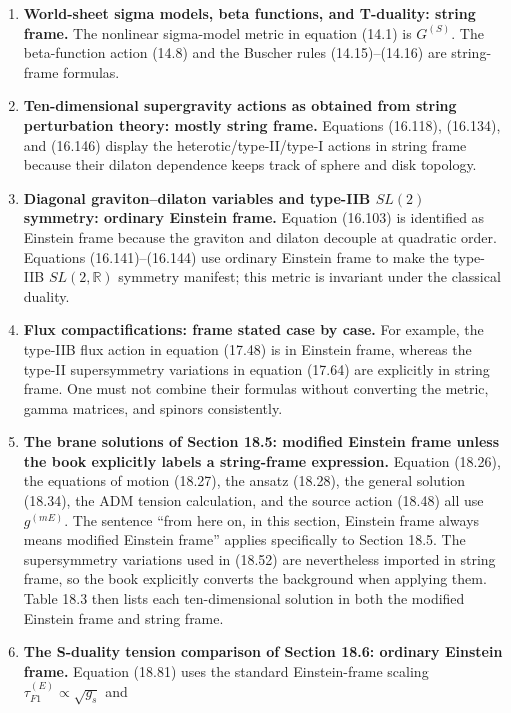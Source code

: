 \documentclass[
  10pt,
  a4paper,
  openany]{book}
\begin{document}
\begin{enumerate}
\def\labelenumi{\arabic{enumi}.}
\item
  \textbf{World-sheet sigma models, beta functions, and T-duality:
  string frame.} The nonlinear sigma-model metric in equation (14.1) is
  \(G^{(S)}\). The beta-function action (14.8) and the Buscher rules
  (14.15)--(14.16) are string-frame formulas.
\item
  \textbf{Ten-dimensional supergravity actions as obtained from string
  perturbation theory: mostly string frame.} Equations (16.118),
  (16.134), and (16.146) display the heterotic/type-II/type-I actions in
  string frame because their dilaton dependence keeps track of sphere
  and disk topology.
\item
  \textbf{Diagonal graviton--dilaton variables and type-IIB \(SL(2)\)
  symmetry: ordinary Einstein frame.} Equation (16.103) is identified as
  Einstein frame because the graviton and dilaton decouple at quadratic
  order. Equations (16.141)--(16.144) use ordinary Einstein frame to
  make the type-IIB \(SL(2,\mathbb R)\) symmetry manifest; this metric
  is invariant under the classical duality.
\item
  \textbf{Flux compactifications: frame stated case by case.} For
  example, the type-IIB flux action in equation (17.48) is in Einstein
  frame, whereas the type-II supersymmetry variations in equation
  (17.64) are explicitly in string frame. One must not combine their
  formulas without converting the metric, gamma matrices, and spinors
  consistently.
\item
  \textbf{The brane solutions of Section 18.5: modified Einstein frame
  unless the book explicitly labels a string-frame expression.} Equation
  (18.26), the equations of motion (18.27), the ansatz (18.28), the
  general solution (18.34), the ADM tension calculation, and the source
  action (18.48) all use \(g^{(mE)}\). The sentence ``from here on, in
  this section, Einstein frame always means modified Einstein frame''
  applies specifically to Section 18.5. The supersymmetry variations
  used in (18.52) are nevertheless imported in string frame, so the book
  explicitly converts the background when applying them. Table 18.3 then
  lists each ten-dimensional solution in both the modified Einstein
  frame and string frame.
\item
  \textbf{The S-duality tension comparison of Section 18.6: ordinary
  Einstein frame.} Equation (18.81) uses the standard Einstein-frame
  scaling \(\tau_{F1}^{(E)}\propto\sqrt{g_s}\) and

\end{enumerate}
\end{document}
